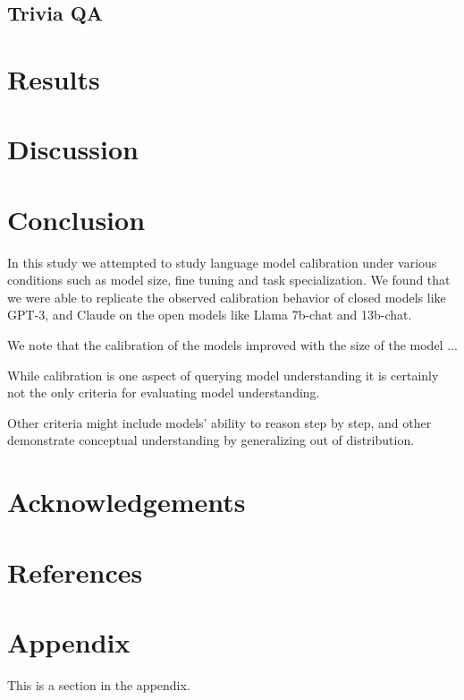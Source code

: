 \documentclass[11pt]{article}
\begin{document}
\subsection{Trivia QA}


\section{Results}


\section{Discussion}

\section{Conclusion}

In this study we attempted to study language model calibration 
under various conditions such as model size, fine tuning and  
task specialization. We found that we were able to replicate the 
observed  calibration behavior of closed models like GPT-3, and 
Claude on the open models like Llama 7b-chat and 13b-chat. 

We note that the calibration of the models  improved with the size 
of the model ...

While calibration is one aspect of querying model understanding it is 
certainly  not the only criteria for evaluating model understanding.  

Other criteria might include models' ability to reason step by step, 
and other demonstrate conceptual understanding by generalizing 
out of distribution. 

\section{Acknowledgements}

\section{References}




\appendix

\section{Appendix}
\label{sec:appendix}

This is a section in the appendix.
\end{document}
